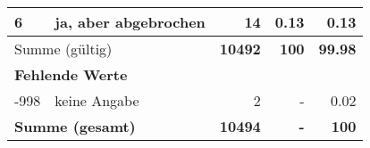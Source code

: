 \begin{longtable}{lXrrr}
     6 &
     \multicolumn{1}{X}{ ja, aber abgebrochen   } &


       \num{14} &
       \num[round-mode=places,round-precision=2]{0.13} &
         \num[round-mode=places,round-precision=2]{0.13} \\
     \midrule
     \multicolumn{2}{l}{Summe (gültig)} &
       \textbf{\num{10492}} &
     \textbf{\num{100}} &
       \textbf{\num[round-mode=places,round-precision=2]{99.98}} \\
     \multicolumn{5}{l}{\textbf{Fehlende Werte}}\\
       -998 &
       keine Angabe &
         \num{2} &
        - &
         \num[round-mode=places,round-precision=2]{0.02} \\
     \midrule
     \multicolumn{2}{l}{\textbf{Summe (gesamt)}} &
          \textbf{\num{10494}} &
        \textbf{-} &
        \textbf{\num{100}} \\
     \bottomrule
     \end{longtable}
     
